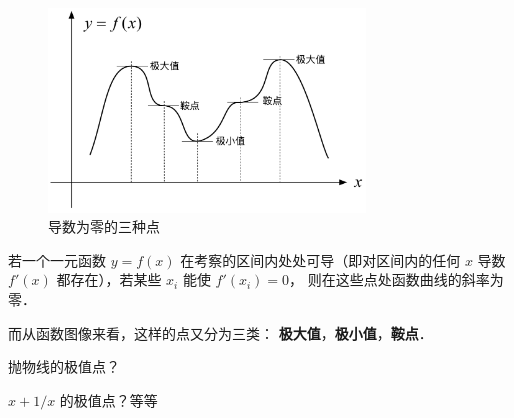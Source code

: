 
\begin{figure}[ht]
\vskip-10pt
\centering
\includegraphics[width=0.75\textwidth]{./figures/DerMax.pdf}
\caption{导数为零的三种点} %
\end{figure}

若一个一元函数 $y = f(x)$ 在考察的区间内处处可导（即对区间内的任何 $x$ 导数 $f'(x)$ 都存在），若某些 ${x_i}$ 能使 $f'(x_i) = 0$， 则在这些点处函数曲线的斜率为零．

而从函数图像来看，这样的点又分为三类： \textbf{极大值}，\textbf{极小值}，\textbf{鞍点}．

\begin{exam}{}
抛物线的极值点？%

$x+1/x$ 的极值点？等等%
\end{exam}













